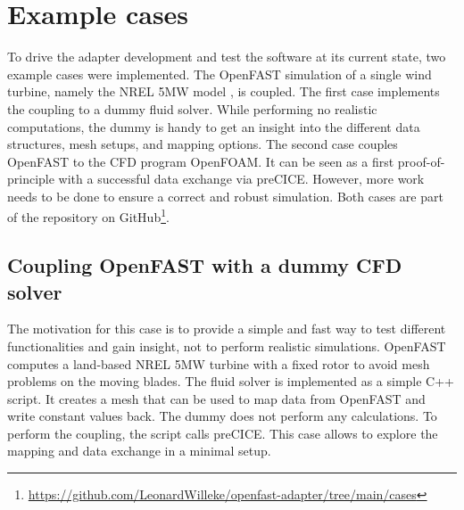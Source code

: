 \section{Example cases}
\label{section:cases}

To drive the adapter development and test the software at its current state, two example cases were implemented. The OpenFAST simulation of a single wind turbine, namely the NREL 5MW model \cite{Jonkman:2009}, is coupled. The first case implements the coupling to a dummy fluid solver. While performing no realistic computations, the dummy is handy to get an insight into the different data structures, mesh setups, and mapping options. The second case couples OpenFAST to the CFD program OpenFOAM. It can be seen as a first proof-of-principle with a successful data exchange via preCICE. However, more work needs to be done to ensure a correct and robust simulation. Both cases are part of the repository on GitHub\footnote{\url{https://github.com/LeonardWilleke/openfast-adapter/tree/main/cases}}.

\subsection{Coupling OpenFAST with a dummy CFD solver}
\label{section:cases:dummy}

The motivation for this case is to provide a simple and fast way to test different functionalities and gain insight, not to perform realistic simulations. OpenFAST computes a land-based NREL 5MW turbine with a fixed rotor to avoid mesh problems on the moving blades. The fluid solver is implemented as a simple C++ script. It creates a mesh that can be used to map data from OpenFAST and write constant values back. The dummy does not perform any calculations. To perform the coupling, the script calls preCICE. This case allows to explore the mapping and data exchange in a minimal setup.

